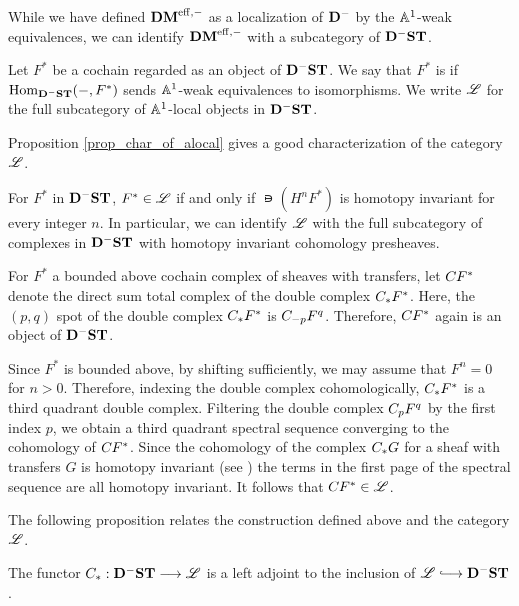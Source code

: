 While we have defined $\DMeff$ as a localization of 
$\DCat^-$ by the $\A^1$-weak equivalences, we can identify
$\DMeff$ with a subcategory of $\DShCor$.

\begin{defn}\label{def_ALocal}
Let $F^*$ be a cochain regarded as an object of $\DShCor$. We say that $F^*$ is 
 if $\hom_{\DShCor}(-, F^*)$ sends $\A^1$-weak 
equivalences to isomorphisms. We write $\ALocal$ for the full 
subcategory of $\A^1$-local objects in $\DShCor$.
\end{defn}

Proposition \ref{prop_char_of_alocal} gives a good 
characterization of the category $\ALocal$.

\begin{prop}\label{prop_char_of_alocal}
For $F^*$ in $\DShCor$, $F^* \in \ALocal$ if and only if $\nis(H^n
F^*)$ is homotopy invariant for every integer $n$. In particular, we
can identify $\ALocal$ with the full subcategory of complexes in
$\DShCor$ with homotopy invariant cohomology presheaves.
\end{prop}

\begin{defn}
For $F^*$ a bounded above cochain complex of sheaves with transfers,
let $\suslC[] F^*$ denote the direct sum total complex of the double complex
$\suslC[*] F^*$. Here, the $(p,q)$ spot of the double complex
$\suslC[*] F^*$ is $\suslC[-p] F^q$. Therefore, $\suslC[]F^*$ again is
an object of $\DShCor$.
\end{defn}

Since $F^*$ is bounded above, by
shifting sufficiently, we may assume that $F^n = 0$ for $n > 0$. 
Therefore, indexing the double complex
cohomologically, $\suslC F^*$ is a third quadrant double
complex. Filtering the double complex $\suslC[p] F^q$ by the first index
$p$, we obtain
a third quadrant spectral sequence converging to the cohomology of
$\suslC[] F^*$. Since the cohomology of the complex $\suslC G$ for a
sheaf with transfers $G$ is homotopy invariant (see \cite[2.19]{MVW})
the terms in the first page of the spectral sequence are all homotopy
invariant. It follows that $\suslC[] F^*
\in \ALocal$.

The following proposition relates the construction defined above
and the category $\ALocal$.

\begin{prop}\label{prop_suslC_ALocal}
The functor $\suslC : \DShCor \to \ALocal$ is a left adjoint to
the inclusion of $\ALocal \into \DShCor$.
\end{prop}

